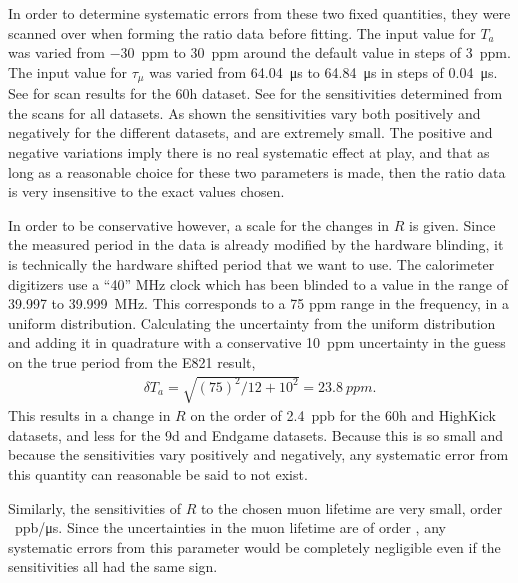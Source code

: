In order to determine systematic errors from these two fixed quantities, they were scanned over when forming the ratio data before fitting. The input value for $T_{a}$ was varied from \SI{-30}{ppm} to \SI{+30}{ppm} around the default value in steps of \SI{3}{ppm}. The input value for $\tau_{\mu}$ was varied from \SI{64.04}{\micro s} to \SI{64.84}{\micro s} in steps of \SI{0.04}{\micro s}. See  for scan results for the 60h dataset. See  for the sensitivities determined from the scans for all datasets. As shown the sensitivities vary both positively and negatively for the different datasets, and are extremely small. The positive and negative variations imply there is no real systematic effect at play, and that as long as a reasonable choice for these two parameters is made, then the ratio data is very insensitive to the exact values chosen. 

In order to be conservative however, a scale for the changes in $R$ is given. Since the measured \gmtwo period in the data is already modified by the hardware blinding, it is technically the hardware shifted \gmtwo period that we want to use. The calorimeter digitizers use a ``40'' MHz clock which has been blinded to a value in the range of 39.997 to \SI{39.999}{MHz}\cite{ClockManual}. This corresponds to a 75 ppm range in the frequency, in a uniform distribution. Calculating the uncertainty from the uniform distribution and adding it in quadrature with a conservative \SI{10}{ppm} uncertainty in the guess on the true \gmtwo period from the E821 result, 
            \begin{align}
                \delta T_{a} = \sqrt{(75)^{2}/12 + 10^{2}} = \SI{23.8}{ppm}.
            \end{align}
This results in a change in $R$ on the order of \SI{2.4}{ppb} for the 60h and HighKick datasets, and less for the 9d and Endgame datasets. Because this is so small and because the sensitivities vary positively and negatively, any systematic error from this quantity can reasonable be said to not exist.

Similarly, the sensitivities of $R$ to the chosen muon lifetime are very small, order \SI{}{ppb/ \micro s}. Since the uncertainties in the muon lifetime are of order \ns{}, any systematic errors from this parameter would be completely negligible even if the sensitivities all had the same sign.


